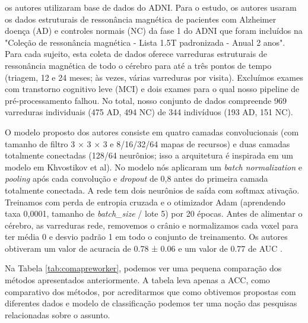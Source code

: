 \documentclass[openright]{UFRGS} %
\begin{document}
 
\cite{rieke2018visualizing}  os autores utilizaram base de dados do ADNI. Para o estudo, os autores usaram os dados estruturais de ressonância magnética de pacientes com Alzheimer doença (AD) e controles normais (NC) da fase 1 do ADNI que foram incluídos
na "Coleção de ressonância magnética - Lista 1.5T padronizada - Anual 2 anos". Para cada
sujeito, esta coleta de dados oferece varreduras estruturais de ressonância magnética de todo o cérebro para até a três pontos de tempo (triagem, 12 e 24 meses; às vezes, várias varreduras
por visita). Excluímos exames com transtorno cognitivo leve (MCI) e dois exames
para o qual nosso pipeline de pré-processamento falhou. No total, nosso conjunto de dados compreende 969
varreduras individuais (475 AD, 494 NC) de 344 indivíduos (193 AD, 151 NC).
  
O  modelo proposto dos autores consiste em quatro camadas convolucionais (com tamanho de filtro 3 × 3 × 3 e
8/16/32/64 mapas de recursos) e duas camadas totalmente conectadas (128/64 neurônios; isso
a arquitetura é inspirada em um modelo em Khvostikov et al). No modelo nós aplicaram um \textit{batch normalization}  e \textit{pooling} após cada convolução e \textit{dropout} de 0,8 antes do
primeira camada totalmente conectada. A rede tem dois neurônios de saída com softmax
ativação. Treinamos com perda de entropia cruzada e o otimizador Adam (aprendendo
taxa 0,0001, tamanho de \textit{batch\_size }/ lote 5) por 20 épocas. Antes de alimentar o cérebro, as varreduras
rede, removemos o crânio e normalizamos cada voxel para ter média 0 e
desvio padrão 1 em todo o conjunto de treinamento. Os autores obtiveram um valor de acuracia de
0.78 ± 0.06 e um valor de  0.77 de AUC \cite{rieke2018visualizing}. 

Na Tabela \ref{tab:comapreworker}, podemos ver uma pequena comparação dos métodos apresentados anteriormente. A tabela leva apenas a ACC, como comparativo dos métodos, por acreditarmos que como obtivemos propostas com diferentes dados e modelo de classificação podemos ter uma noção das pesquisas
relacionadas  sobre o assunto.
\end{document}
